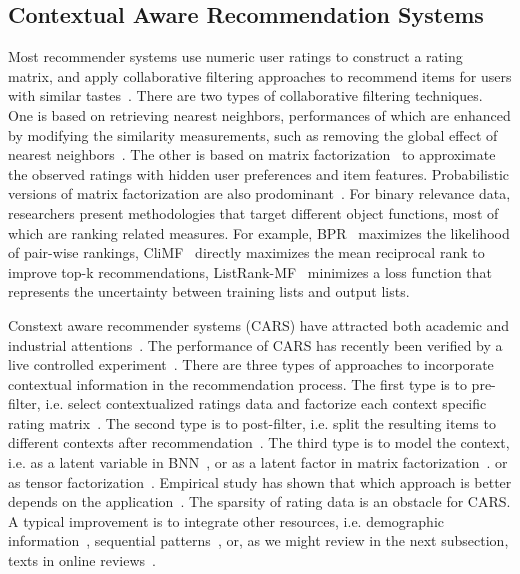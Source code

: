 \documentclass[preprint,12pt]{elsarticle}
\begin{document}
\subsection{Contextual Aware Recommendation Systems}

Most recommender systems use numeric user ratings to construct a rating matrix, and apply collaborative filtering approaches to recommend items for users with similar tastes~\cite{Bobadilla2013Recommender}. There are two types of collaborative filtering techniques. One is based on retrieving nearest neighbors, performances of which are enhanced by modifying the similarity measurements, such as removing the global effect of nearest neighbors~\cite{Bell2007Scalable}. The other is based on matrix factorization~\cite{Koren2009Matrix} to approximate the observed ratings with hidden user preferences and item features. Probabilistic versions of matrix factorization are also prodominant~\cite{salakhutdinov2008probabilistic}. For binary relevance data, researchers present methodologies that target different object functions, most of which are ranking related measures. For example, BPR~\cite{Rendle2009BPR} maximizes the likelihood of pair-wise rankings, CliMF~\cite{Shi2012CLiMF} directly maximizes the mean reciprocal rank to improve top-k recommendations, ListRank-MF~\cite{Shi2010Listwise} minimizes a loss function that  represents the uncertainty between training lists and output lists.   

Constext aware recommender systems (CARS) have attracted both academic and industrial attentions~\cite{Adomavicius2011Context}. The performance of CARS has recently been verified by a live controlled experiment~\cite{Gorgoglione2011Effect}. There are three types of approaches to incorporate contextual information in the recommendation process. The first type is to pre-filter, i.e. select contextualized ratings data and factorize each context specific rating matrix~\cite{Adomavicius2005Incorporating}. The second type is to post-filter, i.e. split the resulting items to different contexts after recommendation~\cite{Baltrunas2009Context}. The third type is to model the context, i.e. as a latent variable in BNN~\cite{Palmisano2008Using}, or as a latent factor in matrix factorization~\cite{Baltrunas2011Context}. or as tensor factorization~\cite{Wang2015CROWN,Karatzoglou2010Multiverse}. Empirical study has shown that which approach is better depends on the application~\cite{Panniello2009Experimental}. The sparsity of rating data is an obstacle for CARS. A typical improvement is to integrate other resources, i.e. demographic information~\cite{Li2011Towards}, sequential patterns~\cite{Hariri2012Context}, or, as we might review in the next subsection, texts in online reviews~\cite{Li2010Contextual,Levi2012Finding,Hariri2013Query,Liu2013Combining}. 
\end{document}
